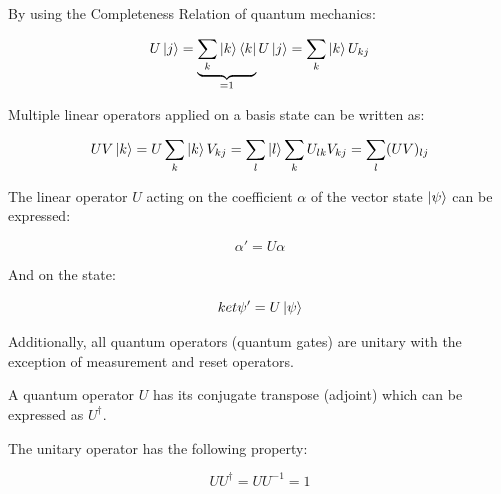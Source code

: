 \documentclass{article}
\begin{document}
\noindent
By using the Completeness Relation of quantum mechanics:
\vspace{5mm}

\begin{equation}
U\ket{j} = \underbrace{\sum\limits_k\ket{k}\bra{k}}_{ = 1} U\ket{j} = \sum\limits_k \ket{k} U_{kj}    
\end{equation}
\vspace{5mm}

\noindent
Multiple linear operators applied on a basis state can be written as:
\vspace{5mm}

\begin{equation}
UV\ket{k} = U\sum\limits_k \ket{k}V_{kj} = \sum\limits_l\ket{l} \sum\limits_k U_{lk} V_{kj} = \sum\limits_l(UV)_{lj}
\end{equation}
\vspace{5mm}

\noindent
The linear operator $U$ acting on the coefficient $\alpha$ of the vector state $\ket{\psi}$ can be expressed:
\vspace{5mm}

\begin{equation}
\alpha' = U\alpha
\end{equation}
\vspace{5mm}

\noindent
And on the state:
\vspace{5mm}

\begin{equation}
ket{\psi'} = U\ket{\psi}
\end{equation}
\vspace{5mm}

\noindent
Additionally, all quantum operators (quantum gates) are unitary with the exception of measurement and reset operators. 
\vspace{5mm}

\noindent
A quantum operator $U$ has its conjugate transpose (adjoint) which can be expressed as $U^{\dagger}$.
\vspace{5mm}

\noindent
The unitary operator has the following property\cite{noauthor_unitary_2022}:
\vspace{5mm}

\begin{equation}
UU^{\dagger} = UU^{-1} = 1    
\end{equation}
\vspace{5mm}
\end{document}
